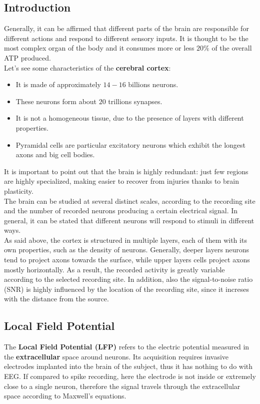 \subsection{Introduction}
Generally, it can be affirmed that different parts of the brain are responsible
for different actions and respond to different sensory inputs. It is
thought to be the most complex organ of the body and it consumes more or less
\(20\%\) of the overall ATP produced.\\
Let's see some characteristics of the \textbf{cerebral cortex}:
\begin{itemize}
    \item It is made of approximately \(14-16\) billions neurons.
    \item These neurons form about \(20\) trillions synapses.
    \item It is not a homogeneous tissue, due to the presence of layers with
          different properties.
    \item Pyramidal cells are particular excitatory neurons which exhibit the longest
          axons and big cell bodies.
\end{itemize}
It is important to point out that the brain is highly redundant:
just few regions are highly specialized, making easier to recover from injuries
thanks to brain plasticity.\\

The brain can be studied at several distinct scales, according to the recording site
and the number of recorded neurons producing a certain electrical signal. In general,
it can be stated that different neurons will respond to stimuli in different ways.\\ 

As said above, the cortex is structured in multiple layers, each of them with its own
properties, such as the density of neurons. Generally, deeper layers neurons
tend to project axons towards the surface, while upper layers cells project axons
mostly horizontally. As a result, the recorded activity is greatly variable according
to the selected recording site. In addition, also the signal-to-noise ratio (SNR) is
highly influenced by the location of the recording site, since it increses with the
distance from the source.

\subsection{Local Field Potential}
The \textbf{Local Field Potential (LFP)} refers to the electric potential measured in the
\textbf{extracellular} space around neurons. Its acquisition requires invasive electrodes
implanted into the brain of the subject, thus it has nothing to do with EEG. If compared to
spike recording, here the electrode is not inside or extremely close to a single neuron,
therefore the signal travels through the extracellular space according to Maxwell's
equations.\\ 

